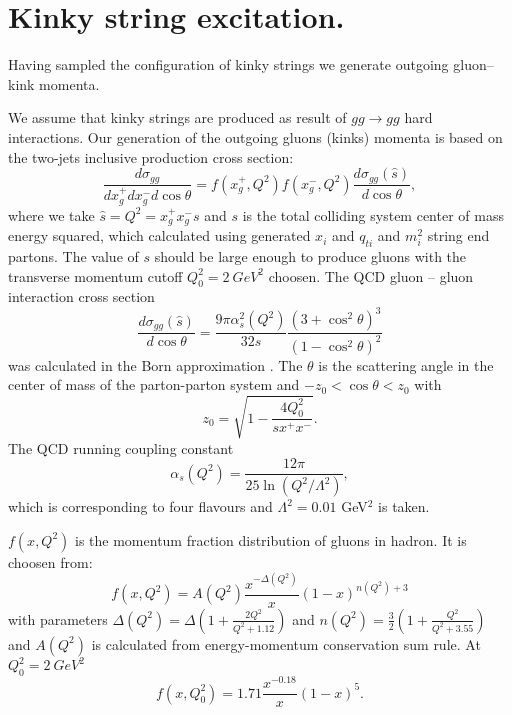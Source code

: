 \section {Kinky string excitation.}

\hspace{1.0em}Having sampled the configuration of kinky strings  
we generate outgoing gluon--kink momenta.
 
We assume that kinky strings are produced as result of $gg \rightarrow
gg$ hard interactions. Our generation of the outgoing gluons (kinks)
momenta is based on the two-jets inclusive production cross section:
\begin{equation}
\label{KSE1} \frac{d\sigma_{gg}}{dx_g^{+}dx_g^{-}d\cos{\theta}}=
 f(x_g^{+},Q^2)f(x_g^{-},Q^2)\frac{d\sigma_{gg}(\hat{s})}{d\cos{\theta}},
\end{equation}
where we take $\hat{s}=Q^2=x_g^{+}x_g^{-}s$ and $s$ is the total
colliding system center of mass energy squared, which calculated using
generated $x_i$ and $q_{ti}$ and $m^2_i$ string end partons. The value
of $s$ should be large enough to produce gluons with the transverse momentum
cutoff $Q^2_{0} = 2 \ GeV^2$ choosen.  The QCD gluon -- gluon
interaction cross section
\begin{equation}
\label{KSE2}
\frac{d\sigma_{gg}(\hat{s})}{d\cos{\theta}} = \frac{9\pi
\alpha^2_s(Q^2)}{32s}\frac{(3+\cos^2{\theta})^3}{(1-\cos^2{\theta})^2}
\end{equation}
was calculated in the Born approximation \cite{CKR77}.  The $\theta$ is
the scattering angle in the center of mass of the parton-parton system
and $-z_0 < \cos{\theta} < z_0$ with
\begin{equation}
\label{KSE3} z_0 = \sqrt{1 - \frac{4Q^2_0}{sx^{+}x^{-}}}.
\end{equation}  
The QCD running coupling constant 
\begin{equation}
\label{KSE4}\alpha_s(Q^2) = \frac{12 \pi}{25 \ln{(Q^2/\Lambda^2)}},
\end{equation} 
which is corresponding to four flavours and $\Lambda^2 = 0.01$ GeV$^2$
is taken.

$f(x,Q^2)$ is the momentum fraction distribution of gluons in hadron. It
is choosen from\cite{CKMT95}:
\begin{equation}
\label{KSE5}
f(x,Q^2) = A(Q^2)\frac{x^{-\Delta(Q^2)}}{x}(1 - x)^{n(Q^2)+3} 
\end{equation}
with parameters $\Delta(Q^2) = \Delta (1 + \frac{2Q^2}{Q^2 + 1.12})$ and
$n(Q^2) = \frac{3}{2}(1+\frac{Q^2}{Q^2 + 3.55})$ and $A(Q^2)$ is
calculated from energy-momentum conservation sum rule.  At $Q^2_{0} = 2
\ GeV^2$
\begin{equation}
\label{KSE6}
f(x,Q^2_{0}) = 1.71\frac{x^{-0.18}}{x}(1 - x)^{5}. 
\end{equation}


